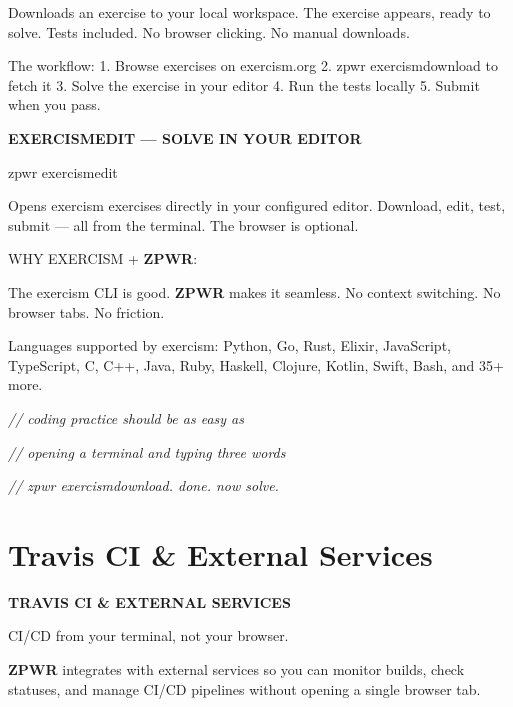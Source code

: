 \documentclass[11pt,a4paper,twoside]{book}
\begin{document}
Downloads an exercise to your local workspace. The exercise appears, ready to solve. Tests included. No browser clicking. No manual downloads.

The workflow: 1. Browse exercises on exercism.org 2. zpwr exercismdownload to fetch it 3. Solve the exercise in your editor 4. Run the tests locally 5. Submit when you pass.


\vspace{12pt}
{\bfseries\color{neonyellow} EXERCISMEDIT — SOLVE IN YOUR \textbf{EDITOR}}\vspace{4pt}

\begin{codebox}
\color{neongreen}zpwr exercismedit\\
\end{codebox}

Opens exercism exercises directly in your configured editor. Download, edit, test, submit — all from the terminal. The browser is optional.

WHY EXERCISM + \textbf{ZPWR}:

The exercism CLI is good. \textbf{ZPWR} makes it seamless. No context switching. No browser tabs. No friction.

Languages supported by exercism: Python, Go, Rust, Elixir, JavaScript, TypeScript, C, C++, Java, Ruby, Haskell, Clojure, Kotlin, Swift, Bash, and 35+ more.

{\small\itshape\color{dimtext} // coding practice should be as easy as}

{\small\itshape\color{dimtext} // opening a terminal and typing three words}

{\small\itshape\color{dimtext} // zpwr exercismdownload. done. now solve.}


\vspace{16pt}

\section{Travis CI \& External Services}


\vspace{10pt}
{\large\bfseries\color{neoncyan} TRAVIS CI \& EXTERNAL SERVICES}\vspace{6pt}

CI/CD from your terminal, not your browser.

\textbf{ZPWR} integrates with external services so you can monitor builds, check statuses, and manage CI/CD pipelines without opening a single browser tab.
\end{document}
